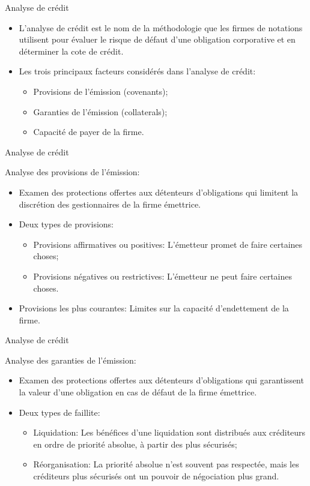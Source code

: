 \documentclass{beamer}
\begin{document}
\begin{frame}{Analyse de crédit}
\begin{itemize}
\item L’analyse de crédit est le nom de la méthodologie que les firmes de notations utilisent pour évaluer le risque de défaut d’une obligation corporative et en déterminer la cote de crédit. 
\item Les trois principaux facteurs considérés dans l’analyse de crédit:
\begin{itemize}
\item Provisions de l’émission (covenants);
\item Garanties de l’émission (collaterals);
\item Capacité de payer de la firme. 
\end{itemize}
\end{itemize}
\end{frame}

\begin{frame}{Analyse de crédit}
\begin{block}{Analyse des provisions de l’émission:}
\begin{itemize}
\item Examen des protections offertes aux détenteurs d’obligations qui limitent la discrétion des gestionnaires de la firme émettrice.  
\item Deux types de provisions: 
\begin{itemize}
\item Provisions affirmatives ou positives: L’émetteur promet de faire certaines choses; 
\item Provisions négatives ou restrictives: L’émetteur ne peut faire certaines choses. 
\end{itemize}
\item Provisions les plus courantes: Limites sur la capacité d’endettement de la firme. 
\end{itemize}
\end{block}
\end{frame}

\begin{frame}{Analyse de crédit}
\begin{block}{Analyse des garanties de l’émission:}
\begin{itemize}
\item Examen des protections offertes aux détenteurs d’obligations qui garantissent la valeur d’une obligation en cas de défaut de la firme émettrice.   
\item Deux types de faillite: 
\begin{itemize}
\item Liquidation: Les bénéfices d’une liquidation sont distribués aux créditeurs en ordre de priorité absolue, à partir des plus sécurisés;
\item Réorganisation: La priorité absolue n’est souvent pas respectée, mais les créditeurs plus sécurisés ont un pouvoir de négociation plus grand.  
\end{itemize}
\end{itemize}
\end{block}
\end{frame}
\end{document}
